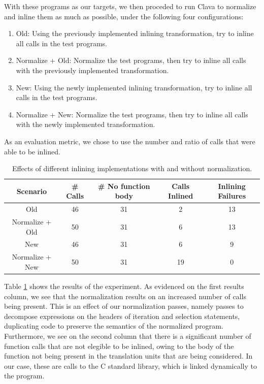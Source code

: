 With these programs as our targets, we then proceded to run Clava to normalize and inline them as much as possible, under the following four configurations:

\begin{enumerate}
    \item Old: Using the previously implemented inlining transformation, try to inline all calls in the test programs.
    \item Normalize + Old: Normalize the test programs, then try to inline all calls with the previously implemented transformation.
    \item New: Using the newly implemented inlining transformation, try to inline all calls in the test programs.
    \item Normalize + New: Normalize the test programs, then try to inline all calls with the newly implemented transformation.
\end{enumerate}

As an evaluation metric, we chose to use the number and ratio of calls that were able to be inlined.

\begin{table}
\centering
\begin{tabular}{|c | c c c c |}
    \hline
    Scenario & \# Calls & \# No function body  & Calls Inlined & Inlining Failures \\
    \hline
    Old & 46 & 31 & 2 & 13 \\
    Normalize + Old & 50 & 31 & 6 & 13 \\
    New & 46 & 31 & 6 & 9 \\
    Normalize + New & 50 & 31 & 19 & 0 \\
    \hline
\end{tabular}
\caption{Effects of different inlining implementations with and without normalization.}
\label{tab:inlining-results}
\end{table}

Table \ref{tab:inlining-results} shows the results of the experiment. As evidenced on the first results column, we see that the normalization results on an increased number of calls being present. This is an effect of our normalization passes, namely passes to decompose expressions on the headers of iteration and selection statements, duplicating code to preserve the semantics of the normalized program. Furthermore, we see on the second column that there is a significant number of function calls that are not elegible to be inlined, owing to the body of the function not being present in the translation units that are being considered. In our case, these are calls to the C standard library, which is linked dynamically to the program.

